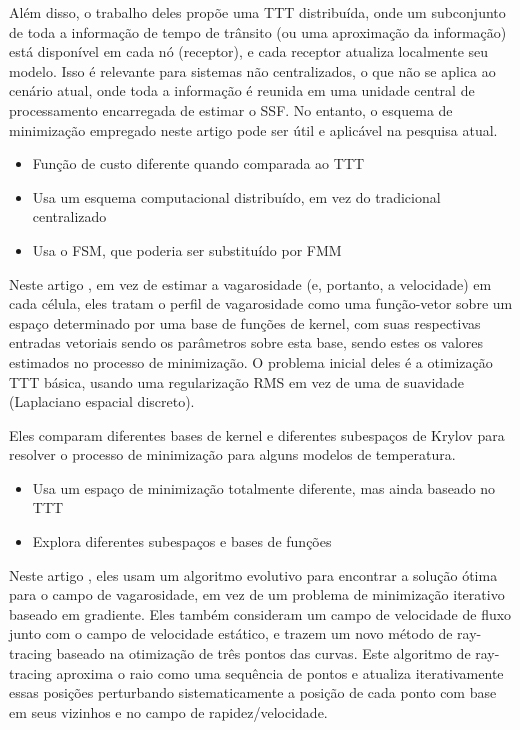 Além disso, o trabalho deles propõe uma TTT distribuída, onde um subconjunto de toda a informação de tempo de trânsito (ou uma aproximação da informação) está disponível em cada nó (receptor), e cada receptor atualiza localmente seu modelo. Isso é relevante para sistemas não centralizados, o que não se aplica ao cenário atual, onde toda a informação é reunida em uma unidade central de processamento encarregada de estimar o SSF. No entanto, o esquema de minimização empregado neste artigo pode ser útil e aplicável na pesquisa atual.

\begin{itemize}
	\item Função de custo diferente quando comparada ao TTT
	\item Usa um esquema computacional distribuído, em vez do tradicional centralizado
	\item Usa o FSM, que poderia ser substituído por FMM
\end{itemize}


Neste artigo \cite{yu_krylov_2021}, em vez de estimar a vagarosidade (e, portanto, a velocidade) em cada célula, eles tratam o perfil de vagarosidade como uma função-vetor sobre um espaço determinado por uma base de funções de kernel, com suas respectivas entradas vetoriais sendo os parâmetros sobre esta base, sendo estes os valores estimados no processo de minimização. O problema inicial deles é a otimização TTT básica, usando uma regularização RMS em vez de uma de suavidade (Laplaciano espacial discreto).

Eles comparam diferentes bases de kernel e diferentes subespaços de Krylov para resolver o processo de minimização para alguns modelos de temperatura.

\begin{itemize}
	\item Usa um espaço de minimização totalmente diferente, mas ainda baseado no TTT
	\item Explora diferentes subespaços e bases de funções
\end{itemize}


Neste artigo \cite{zhang_nonlinear_2022}, eles usam um algoritmo evolutivo para encontrar a solução ótima para o campo de vagarosidade, em vez de um problema de minimização iterativo baseado em gradiente. Eles também consideram um campo de velocidade de fluxo junto com o campo de velocidade estático, e trazem um novo método de ray-tracing baseado na otimização de três pontos das curvas. Este algoritmo de ray-tracing aproxima o raio como uma sequência de pontos e atualiza iterativamente essas posições perturbando sistematicamente a posição de cada ponto com base em seus vizinhos e no campo de rapidez/velocidade.

